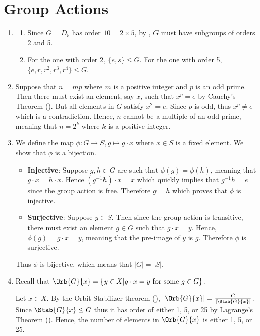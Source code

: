 \section{Group Actions}
\begin{enumerate}
    \item \begin{enumerate}[label=(\alph*)]
        \item Since $G = D_5$ has order $10 = 2 \times 5$, by , $G$ must have subgroups of orders 2 and 5.
        \item For the one with order 2, $\{e, s\} \leq G$. For the one with order 5, $\{e, r, r^2, r^3, r^4\} \leq G$.
    \end{enumerate}

    \item Suppose that $n = mp$ where $m$ is a positive integer and $p$ is an odd prime. Then there must exist an element, say $x$, such that $x^p = e$ by Cauchy's Theorem (). But all elements in $G$ satisfy $x^2 = e$. Since $p$ is odd, thus $x^p \neq e$ which is a contradiction. Hence, $n$ cannot be a multiple of an odd prime, meaning that $n = 2^k$ where $k$ is a positive integer.

    \item We define the map $\phi: G \to S, g \mapsto g \cdot x$ where $x \in S$ is a fixed element. We show that $\phi$ is a bijection.
    \begin{itemize}
        \item \textbf{Injective}: Suppose $g, h \in G$ are such that $\phi(g) = \phi(h)$, meaning that $g\cdot x = h\cdot x$. Hence $(g^{-1}h) \cdot x = x$ which quickly implies that $g^{-1}h = e$ since the group action is free. Therefore $g = h$ which proves that $\phi$ is injective.
        \item \textbf{Surjective}: Suppose $y \in S$. Then since the group action is transitive, there must exist an element $g \in G$ such that $g \cdot x = y$. Hence, $\phi(g) = g\cdot x = y$, meaning that the pre-image of $y$ is $g$. Therefore $\phi$ is surjective.
    \end{itemize}
    Thus $\phi$ is bijective, which means that $|G| = |S|$.

    \item Recall that $\Orb{G}{x} = \{y \in X \vert g\cdot x = y \text{ for some } g \in G\}$.
    
    Let $x \in X$. By the Orbit-Stabilizer theorem (), $|\Orb{G}{x}| = \frac{|G|}{|\Stab{G}{x}|}$. Since $\Stab{G}{x} \leq G$ thus it has order of either 1, 5, or 25 by Lagrange's Theorem (). Hence, the number of elements in $\Orb{G}{x}$ is either 1, 5, or 25.


\end{enumerate}
